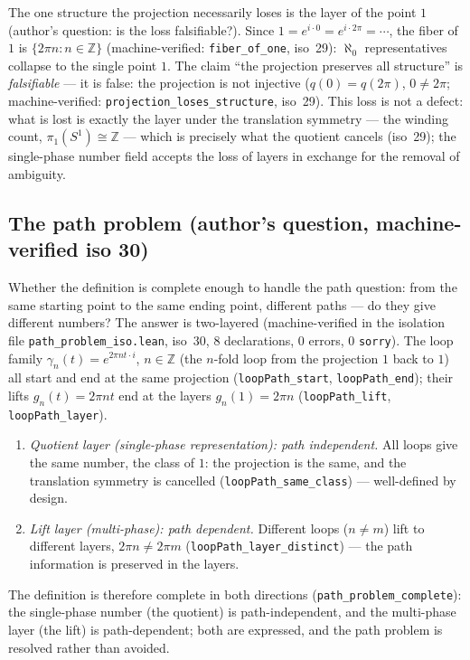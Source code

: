 \documentclass{article}
\begin{document}
The one structure the projection necessarily loses is the layer of the
point $1$ (author's question: is the loss falsifiable?). Since
$1=e^{i\cdot 0}=e^{i\cdot 2\pi}=\cdots$, the fiber of $1$ is
$\{2\pi n:n\in\mathbb Z\}$ (machine-verified:
\texttt{fiber\_of\_one}, iso~29): $\aleph_0$ representatives collapse
to the single point $1$. The claim ``the projection preserves all
structure'' is \emph{falsifiable} --- it is false: the projection is
not injective ($q(0)=q(2\pi)$, $0\neq 2\pi$; machine-verified:
\texttt{projection\_loses\_structure}, iso~29). This loss is not a
defect: what is lost is exactly the layer under the translation
symmetry --- the winding count, $\pi_1(S^1)\cong\mathbb Z$ --- which is
precisely what the quotient cancels (iso~29); the single-phase number
field accepts the loss of layers in exchange for the removal of
ambiguity.

\subsection*{The path problem (author's question, machine-verified iso 30)}

Whether the definition is complete enough to handle the path question:
from the same starting point to the same ending point, different paths
--- do they give different numbers? The answer is two-layered
(machine-verified in the isolation file \texttt{path\_problem\_iso.lean},
iso~30, 8 declarations, 0 errors, 0 \texttt{sorry}). The loop family
$\gamma_n(t)=e^{2\pi n t\cdot i}$, $n\in\mathbb Z$ (the $n$-fold loop
from the projection $1$ back to $1$) all start and end at the same
projection
(\texttt{loopPath\_start}, \texttt{loopPath\_end}); their lifts
$g_n(t)=2\pi n t$ end at the layers $g_n(1)=2\pi n$
(\texttt{loopPath\_lift}, \texttt{loopPath\_layer}).

\begin{enumerate}
\item \emph{Quotient layer (single-phase representation): path
independent.} All loops give the same number, the class of $1$: the
projection is the same, and the translation symmetry is cancelled
(\texttt{loopPath\_same\_class}) --- well-defined by design.
\item \emph{Lift layer (multi-phase): path dependent.} Different loops
($n\neq m$) lift to different layers, $2\pi n\neq 2\pi m$
(\texttt{loopPath\_layer\_distinct}) --- the path information is
preserved in the layers.
\end{enumerate}

The definition is therefore complete in both directions
(\texttt{path\_problem\_complete}): the single-phase number (the
quotient) is path-independent, and the multi-phase layer (the lift) is
path-dependent; both are expressed, and the path problem is resolved
rather than avoided.
\end{document}
